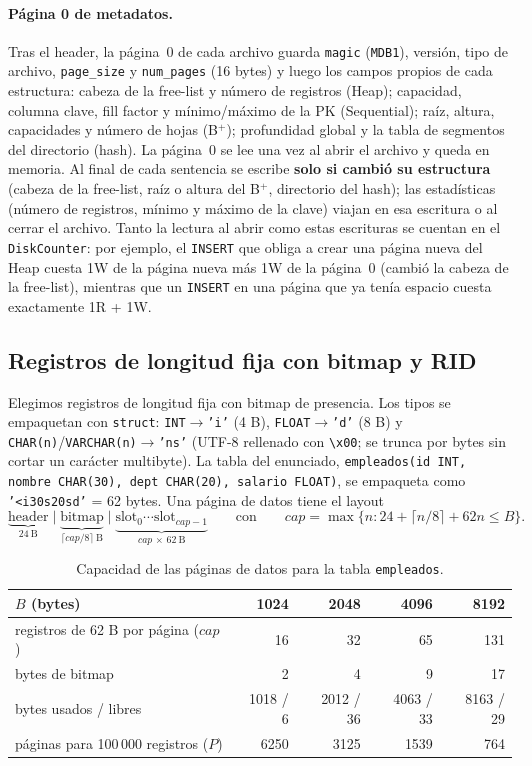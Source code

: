 \documentclass[11pt,a4paper]{article}
\newcommand{\code}[1]{\texttt{#1}}
\begin{document}
\paragraph{Página 0 de metadatos.} Tras el header, la página~0 de cada archivo guarda
\code{magic} (\code{MDB1}), versión, tipo de archivo, \code{page\_size} y \code{num\_pages}
(16 bytes) y luego los campos propios de cada estructura: cabeza de la free-list y número de registros
(Heap); capacidad, columna clave, fill factor y mínimo/máximo de la PK (Sequential); raíz, altura,
capacidades y número de hojas (B$^+$); profundidad global y la tabla de segmentos del directorio (hash).
La página~0 se lee una vez al abrir el archivo y queda en memoria. Al final de cada sentencia se
escribe \textbf{solo si cambió su estructura} (cabeza de la free-list, raíz o altura del B$^+$,
directorio del hash); las estadísticas (número de registros, mínimo y máximo de la clave) viajan en esa
escritura o al cerrar el archivo. Tanto la lectura al abrir como estas escrituras se cuentan en el
\code{DiskCounter}: por ejemplo, el \code{INSERT} que obliga a crear una página nueva del Heap cuesta
1W de la página nueva más 1W de la página~0 (cambió la cabeza de la free-list), mientras que un
\code{INSERT} en una página que ya tenía espacio cuesta exactamente 1R + 1W.

\subsection{Registros de longitud fija con bitmap y RID}

Elegimos registros de longitud fija con bitmap de presencia. Los tipos se empaquetan con
\code{struct}: \code{INT}$\to$\code{'i'} (4 B), \code{FLOAT}$\to$\code{'d'} (8 B) y
\code{CHAR(n)}/\code{VARCHAR(n)}$\to$\code{'ns'} (UTF-8 rellenado con \code{\textbackslash x00}; se
trunca por bytes sin cortar un carácter multibyte). La tabla del enunciado,
\code{empleados(id INT, nombre CHAR(30), dept CHAR(20), salario FLOAT)}, se empaqueta como
\code{'<i30s20sd'} = 62 bytes. Una página de datos tiene el layout
\[
\underbrace{\text{header}}_{24\ \text{B}}\;\big|\;\underbrace{\text{bitmap}}_{\lceil cap/8\rceil\ \text{B}}\;\big|\;\underbrace{\text{slot}_0 \cdots \text{slot}_{cap-1}}_{cap\,\times\,62\ \text{B}}
\qquad\text{con}\qquad cap=\max\{n : 24+\lceil n/8\rceil+62n \le B\}.
\]

\begin{table}[H]
\centering\small
\begin{tabular}{@{}lrrrr@{}}
\toprule
$B$ (bytes) & 1024 & 2048 & 4096 & 8192 \\
\midrule
registros de 62 B por página ($cap$) & 16 & 32 & 65 & 131 \\
bytes de bitmap & 2 & 4 & 9 & 17 \\
bytes usados / libres & 1018 / 6 & 2012 / 36 & 4063 / 33 & 8163 / 29 \\
páginas para 100\,000 registros ($P$) & 6250 & 3125 & 1539 & 764 \\
\bottomrule
\end{tabular}
\caption{Capacidad de las páginas de datos para la tabla \code{empleados}.}
\label{tab:capacidad}
\end{table}
\end{document}
